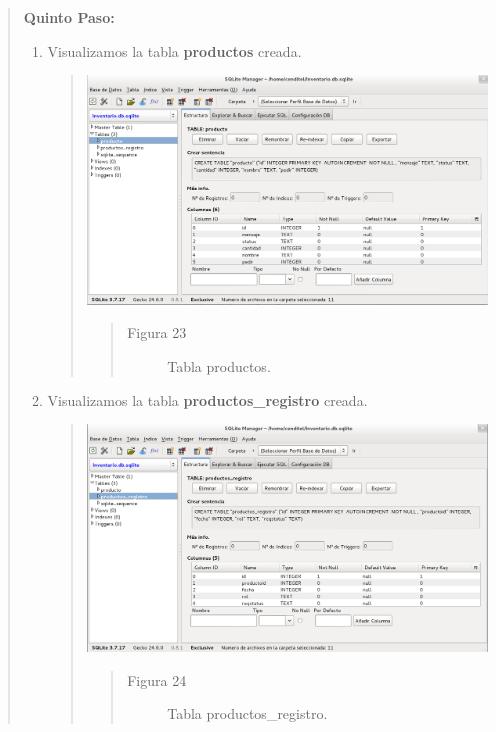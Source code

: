 \documentclass[letterpaper,11pt,spanish]{sphinxmanual}
\begin{document}
\begin{quote}
\begin{quote}
\begin{enumerate}
\begin{quote}
\begin{quote}
\begin{description}
\end{description}\end{quote}
\end{quote}

\end{enumerate}
\end{quote}

\textbf{Quinto Paso:}
\begin{enumerate}
\item {} 
Visualizamos la tabla \textbf{productos} creada.
\begin{quote}

\includegraphics{producto.png}
\begin{quote}\begin{description}
\item[{Figura 23}] \leavevmode
Tabla productos.

\end{description}\end{quote}
\end{quote}

\item {} 
Visualizamos la tabla \textbf{productos\_registro} creada.
\begin{quote}

\includegraphics{producto1.png}
\begin{quote}\begin{description}
\item[{Figura 24}] \leavevmode
Tabla productos\_registro.


\end{description}
\end{quote}
\end{quote}
\end{enumerate}
\end{quote}
\end{document}
